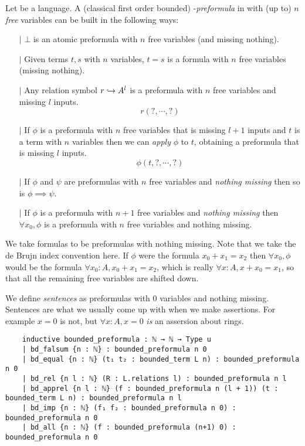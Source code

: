 \begin{dfn}[Formulas]
  Let  be a language.
  A (classical first order bounded) -\textit{preformula} in 
  with (up to) $n$ \textit{free} variables can be built in the following ways:
  \begin{itemize}
    \item[$\vert$] $\bot$ is an atomic preformula with $n$ free variables
          (and missing nothing).
    \item[$\vert$]
          Given terms $t, s$ with $n$ variables,
          $t = s$ is a formula with $n$ free variables (missing nothing).
    \item[$\vert$] Any relation symbol $r \hookrightarrow A^{l}$ is a preformula
          with $n$ free variables and missing $l$ inputs.
          \[ r (?, \cdots, ?)\]
    \item[$\vert$] If $\phi$ is a preformula with $n$ free variables that is missing
          $l + 1$ inputs and $t$ is a term with $n$ variables
          then we can \textit{apply} $\phi$ to $t$, obtaining
          a preformula that is missing $l$ inputs.
          \[ \phi(t , ? , \cdots, ? )\]
    \item[$\vert$] If $\phi$ and $\psi$ are preformulas with $n$ free variables
          and \textit{nothing missing} then so is $\phi \implies \psi$.
    \item[$\vert$] If $\phi$ is a preformula with $n + 1$ free variables
          and \textit{nothing missing} then $\forall x_{0}, \phi$ is a preformula
          with $n$ free variables and nothing missing.
  \end{itemize}

  We take formulas to be preformulas with nothing missing.
  Note that we take the de Brujn index convention here.
  If $\phi$ were the formula $x_{0} + x_{1} = x_{2}$ then
  $\forall x_{0}, \phi$ would be the formula $\forall x_{0} : A, x_{0} + x_{1} = x_{2}$,
  which is really $\forall x : A, x + x_{0} = x_{1}$,
  so that all the remaining free variables are shifted down.

  We define \textit{sentences} as preformulas with $0$ variables and nothing missing.
  Sentences are what we usually come up with when we make assertions.
  For example $x = 0$ is not, but $\forall x : A, x = 0$ \textit{is} an assersion about rings.

  \begin{lstlisting}
    inductive bounded_preformula : ℕ → ℕ → Type u
    | bd_falsum {n : ℕ} : bounded_preformula n 0
    | bd_equal {n : ℕ} (t₁ t₂ : bounded_term L n) : bounded_preformula n 0
    | bd_rel {n l : ℕ} (R : L.relations l) : bounded_preformula n l
    | bd_apprel {n l : ℕ} (f : bounded_preformula n (l + 1)) (t : bounded_term L n) : bounded_preformula n l
    | bd_imp {n : ℕ} (f₁ f₂ : bounded_preformula n 0) : bounded_preformula n 0
    | bd_all {n : ℕ} (f : bounded_preformula (n+1) 0) : bounded_preformula n 0


\end{lstlisting}
\end{dfn}
